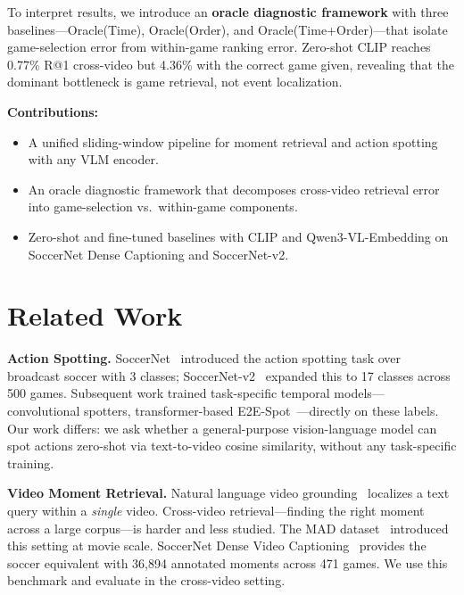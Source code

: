 \documentclass[10pt,twocolumn]{article}
\begin{document}
To interpret results, we introduce an \textbf{oracle diagnostic framework} with three baselines---Oracle(Time), Oracle(Order), and Oracle(Time+Order)---that isolate game-selection error from within-game ranking error. Zero-shot CLIP reaches 0.77\% R@1 cross-video but 4.36\% with the correct game given, revealing that the dominant bottleneck is game retrieval, not event localization.

\noindent\textbf{Contributions:}
\begin{itemize}[nosep, leftmargin=*]
  \item A unified sliding-window pipeline for moment retrieval and action spotting with any VLM encoder.
  \item An oracle diagnostic framework that decomposes cross-video retrieval error into game-selection vs.\ within-game components.
  \item Zero-shot and fine-tuned baselines with CLIP and Qwen3-VL-Embedding on SoccerNet Dense Captioning and SoccerNet-v2.
\end{itemize}

\section{Related Work}

\noindent\textbf{Action Spotting.}
SoccerNet~\cite{giancola2018soccernet} introduced the action spotting task over broadcast soccer with 3 classes; SoccerNet-v2~\cite{deliege2021soccernetv2} expanded this to 17 classes across 500 games. Subsequent work trained task-specific temporal models---convolutional spotters, transformer-based E2E-Spot~\cite{hong2022e2espot}---directly on these labels. Our work differs: we ask whether a general-purpose vision-language model can spot actions zero-shot via text-to-video cosine similarity, without any task-specific training.

\noindent\textbf{Video Moment Retrieval.}
Natural language video grounding~\cite{anne2017localizing} localizes a text query within a \emph{single} video. Cross-video retrieval---finding the right moment across a large corpus---is harder and less studied. The MAD dataset~\cite{soldan2022mad} introduced this setting at movie scale. SoccerNet Dense Video Captioning~\cite{zhou2024soccernet} provides the soccer equivalent with 36,894 annotated moments across 471 games. We use this benchmark and evaluate in the cross-video setting.
\end{document}
